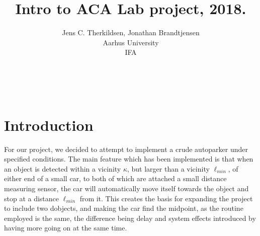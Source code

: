 \documentclass[a4paper,onecolumn,amsmath,amssymb]{revtex4-1}
\begin{document}


\


\begin{titlepage}
\vspace{1cm}
\title{\Huge{Intro to ACA Lab project, 2018.}}
\author{Jens C. Therkildsen,  Jonathan Brandtjensen\\
Aarhus University\\
IFA}
\maketitle
\end{titlepage}
\newpage
{}
\mbox{}
\newpage
{}

\tableofcontents

\cleardoublepage



\noindent
\section{\textbf{Introduction}}

For our project, we decided to attempt to implement a crude autoparker under specified conditions. The main feature which has been implemented is that when an object is detected within a vicinity $\kappa$, but larger than a vicinity $\ell_{min}$, of either end of a small car, to both of which are attached a small distance measuring sensor, the car will automatically move itself towards the object and stop at a distance $\ell_{min}$ from it. This creates the basis for expanding the project to include two dobjects, and making the car find the midpoint, as the routine employed is the same, the difference being delay and system effects introduced by having more going on at the same time.\\
\end{document}
